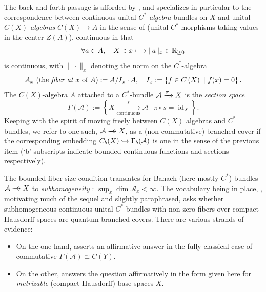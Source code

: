 \documentclass[11pt,leqno]{article}
\theoremstyle{plain}
\theoremstyle{plain}
\theoremstyle{plain}
\numberwithin{equation}{section}
\theoremstyle{nonumberplain}
\newcommand\bR{{\mathbb R}}
\newcommand\cA{{\mathcal A}}
\newcommand\1{{\bf 1}}
\DeclareMathOperator{\id}{id}
\newcommand{\xrightarrowdbl}[2][]{%
  \xrightarrow[#1]{#2}\mathrel{\mkern-14mu}\rightarrow
}
\begin{document}
The back-and-forth passage is afforded by \cite[Scholium 6.7]{hk_shv-bdl}, and specializes in particular to the correspondence between continuous unital {\it $C^*$-algebra} bundles on $X$ \cite[p.9]{dg_ban-bdl} and unital {\it $C\left(X\right)$-algebras} $C\left(X\right)\to A$ in the sense of \cite[Definition 1.5]{zbMATH04056334} (unital $C^*$ morphisms taking values in the center $Z(A)$), continuous in that
\begin{equation*}
  \forall a\in A
  ,\quad
  X\ni x
  \xmapsto{\quad}
  \|a\|_x\in \bR_{\ge 0}
\end{equation*}
is continuous, with $\|\cdot\|_x$ denoting the norm on the $C^*$-algebra
\begin{equation*}
  A_x\text{ (the {\it fiber at $x$} of $A$)}:=A/I_x\cdot A
  ,\quad
  I_x:=\left\{f\in C\left(X\right)\ |\ f(x)=0\right\}.
\end{equation*}
The $C(X)$-algebra $A$ attached to a $C^*$-bundle $\cA\xrightarrowdbl{\pi}X$ is the {\it section space} \cite[p.9]{dg_ban-bdl}
\begin{equation*}
  \Gamma(\cA)
  :=
  \left\{X\xrightarrow[\text{continuous}]{s}\cA\ |\ \pi\circ s = \id_X\right\}.
\end{equation*}
Keeping with the spirit of moving freely between $C(X)$ algebras and $C^*$ bundles, we refer to one such, $\cA\xrightarrowdbl{}X$, as a (non-commutative) branched cover if the corresponding embedding $C_b(X)\lhook\joinrel\to \Gamma_b(\cA)$ is one in the sense of the previous item (`b' subscripts indicate bounded continuous functions and sections respectively). 

The bounded-fiber-size condition translates for Banach (here mostly $C^*$) bundles $\cA\xrightarrowdbl{}X$ to {\it subhomogeneity} \cite[p.3]{bg_cx-exp}: $\sup_x \dim \cA_x<\infty$. The vocabulary being in place, \cite[Problem 3.11]{bg_cx-exp}, motivating much of the sequel and slightly paraphrased, asks whether subhomogeneous continuous unital $C^*$ bundles with non-zero fibers over compact Hausdorff spaces are quantum branched covers. There are various strands of evidence: 
\begin{itemize}[wide]
\item On the one hand, \cite[Theorem 1.1, implications (1) $\Rightarrow$ (2) and/or (3)]{pt_brnch} asserts an affirmative answer in the fully classical case of commutative $\Gamma(\cA)\cong C(Y)$.

\item On the other, \cite[Theorem 2.12]{2409.03531v1} answers the question affirmatively in the form given here for {\it metrizable} (compact Hausdorff) base spaces $X$. 
\end{itemize}
\end{document}
